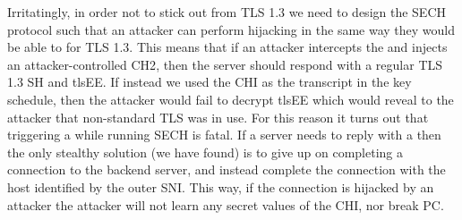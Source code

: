 Irritatingly, in order not to stick out from \ac{TLS} 1.3
we need to design the \ac{SECH} protocol such that an attacker
can perform  hijacking  in the same way
they would be able to for \ac{TLS} 1.3.
This means that if an attacker intercepts the 
and injects an attacker-controlled \ac{CH2},
then the server should respond with a regular \ac{TLS} 1.3
\ac{SH} and \ac{tlsEE}.
If instead we used the \ac{CHI} as the transcript
in the key schedule,
then the attacker would
fail to decrypt \ac{tlsEE} which would
reveal to the attacker that non-standard \ac{TLS} was in use.
For this reason it turns out that triggering a 
while running \ac{SECH} is fatal.
If a server needs to reply with a  then the only
stealthy solution (we have found)
is to give up on completing a connection
to the backend server, and instead complete
the connection with the host identified by the outer \ac{SNI}.
This way, if the connection is hijacked by an attacker
the attacker will not learn any secret values of the \ac{CHI}, nor break \ac{PC}.
